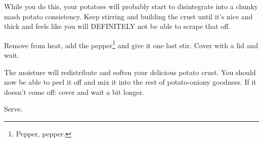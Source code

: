 \begin{recipe}
{        While you do this, your potatoes will probably start to disintegrate into a chunky mash potato consistency. Keep stirring and building the crust until it’s nice and thick and feels like you will DEFINITELY not be able to scrape that off.
        
        \step Remove from heat, add the pepper\footnote{Pepper, pepper.} and give it one last stir. Cover with a lid and wait.

        \vspace{15em}

        \step The moisture will redistribute and soften your delicious potato crust. You should now be able to peel it off and mix it into the rest of potato-oniony goodness. If it doesn’t come off: cover and wait a bit longer.
        
        \step Serve.
    }
    
\end{recipe}